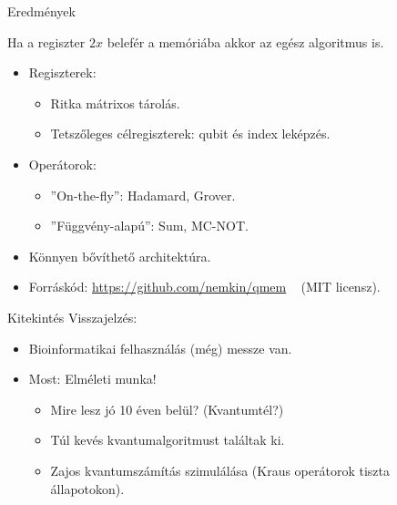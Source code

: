 \documentclass[aspectratio=169]{beamer}
\begin{document}
\begin{frame}{Eredmények}

Ha a regiszter $2x$ belefér a memóriába akkor az egész algoritmus is.

\begin{itemize}
    \item Regiszterek:
    \begin{itemize}
      \item Ritka mátrixos tárolás.
      \item Tetszőleges célregiszterek: qubit és index leképzés.
    \end{itemize}
    \item Operátorok:
    \begin{itemize}
      \item ''On-the-fly'': Hadamard, Grover.
      \item ''Függvény-alapú'': Sum, MC-NOT.
    \end{itemize}
    \item Könnyen bővíthető architektúra.
    \item Forráskód: \color{blue}\href{https://github.com/nemkin/qmem}{https://github.com/nemkin/qmem}\color{black} ~ (MIT licensz).
\end{itemize}
\end{frame}

\begin{frame}{Kitekintés}
Visszajelzés:
\begin{itemize}
    \item Bioinformatikai felhasználás (még) messze van.
    \item Most: Elméleti munka!
    \begin{itemize}
        \item Mire lesz jó 10 éven belül? (Kvantumtél?)
        \item Túl kevés kvantumalgoritmust találtak ki.
        \item Zajos kvantumszámítás szimulálása (Kraus operátorok tiszta állapotokon).
    \end{itemize}    
\end{itemize}
\end{frame}
\end{document}
